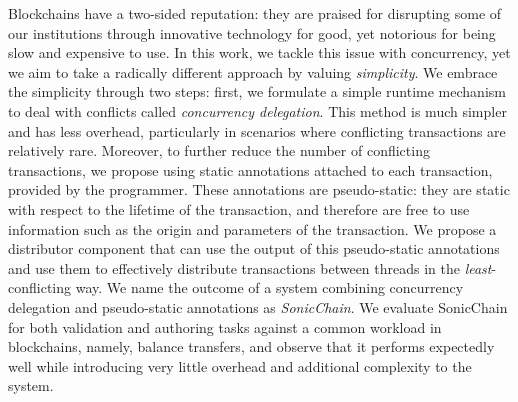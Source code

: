 \begin{abstracts}

Blockchains have a two-sided reputation: they are praised for disrupting some of our institutions
through innovative technology for good, yet notorious for being slow and expensive to use. In this
work, we tackle this issue with concurrency, yet we aim to take a radically different approach by
valuing \textit{simplicity}. We embrace the simplicity through two steps: first, we formulate a
simple runtime mechanism to deal with conflicts called \textit{concurrency delegation}. This method
is much simpler and has less overhead, particularly in scenarios where conflicting transactions are
relatively rare. Moreover, to further reduce the number of conflicting transactions, we propose
using static annotations attached to each transaction, provided by the programmer. These annotations
are pseudo-static: they are static with respect to the lifetime of the transaction, and therefore
are free to use information such as the origin and parameters of the transaction. We propose a
distributor component that can use the output of this pseudo-static annotations and use them to
effectively distribute transactions between threads in the \textit{least}-conflicting way. We name
the outcome of a system combining concurrency delegation and pseudo-static annotations as
\textit{SonicChain}. We evaluate SonicChain for both validation and authoring tasks against a common
workload in blockchains, namely, balance transfers, and observe that it performs expectedly well
while introducing very little overhead and additional complexity to the system.

\end{abstracts}
